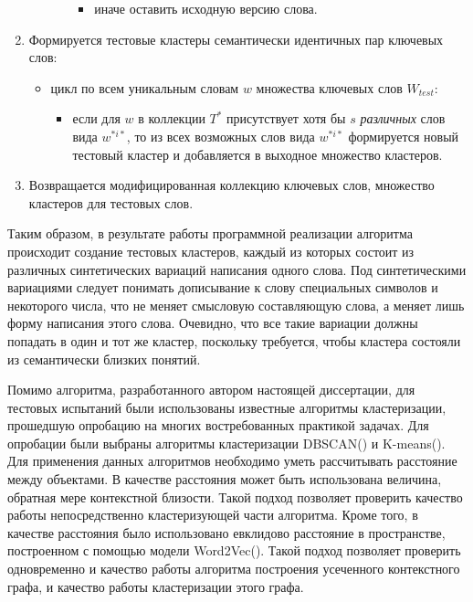 \begin{enumerate}
\begin{itemize}
\begin{itemize}
\begin{itemize}
                            \item иначе оставить исходную версию слова.
                        \end{itemize}
                \end{itemize}
        \end{itemize}
    \item Формируется тестовые кластеры семантически идентичных пар ключевых слов:
        \begin{itemize}
            \item цикл по всем уникальным словам $w$ множества ключевых слов $W_{test}$:
                \begin{itemize}
                    \item если для $w$ в коллекции $T^*$ присутствует хотя бы $s$ \emph{различных} слов вида $w^{*i*}$, то из всех возможных слов вида $w^{*i*}$ формируется новый тестовый кластер и добавляется в выходное множество кластеров.
                \end{itemize}
        \end{itemize}
    \item Возвращается модифицированная коллекцию ключевых слов, множество кластеров для тестовых слов.
\end{enumerate}

Таким образом, в результате работы программной реализации алгоритма происходит создание тестовых кластеров, каждый из которых состоит из различных синтетических вариаций написания одного слова. Под синтетическими вариациями следует понимать дописывание к слову специальных символов и некоторого числа, что не меняет смысловую составляющую слова, а меняет лишь форму написания этого слова. Очевидно, что все такие вариации должны попадать в один и тот же кластер, поскольку требуется, чтобы кластера состояли из семантически близких понятий.

Помимо алгоритма, разработанного автором настоящей диссертации, для тестовых испытаний были использованы известные алгоритмы кластеризации, прошедшую опробацию на многих востребованных практикой задачах. Для опробации были выбраны алгоритмы кластеризации DBSCAN(\cite{dbscan}) и K-means(\cite{kmeans}). Для применения данных алгоритмов необходимо уметь рассчитывать расстояние между объектами. В качестве расстояния может быть использована величина, обратная мере контекстной близости. Такой подход позволяет проверить качество работы непосредственно кластеризующей части алгоритма. Кроме того, в качестве расстояния было использовано евклидово расстояние в пространстве, построенном с помощью модели Word2Vec(\cite{word2vec}). Такой подход позволяет проверить одновременно и качество работы алгоритма построения усеченного контекстного графа, и качество работы кластеризации этого графа.

